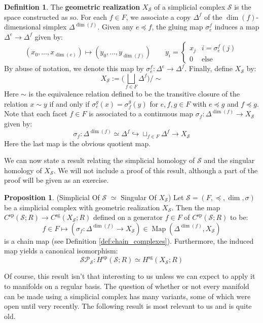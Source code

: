 \documentclass[12pt]{article}
\theoremstyle{definition}
\newtheorem{definition}[theorem]{Definition}
\newtheorem{proposition}[theorem]{Proposition}
\numberwithin{equation}{section}
\newcommand{\op}{\operatorname}
\begin{document}
\begin{definition}
The {\bf geometric realization} $X_{\mathcal{S}}$ of a simplicial complex $\mathcal{S}$ is the space constructed as so. For each $f \in F$, we associate a copy $\Delta^f$ of the $\op{dim}(f)$-dimensional simplex $\Delta^{\op{dim}(f)}$. Given any $e \preccurlyeq f$, the gluing map $\sigma_e^f$ induces a map $\Delta^e \to \Delta^f$ given by:
\[
(x_0,\dots,x_{\op{dim}(e)}) \mapsto (y_0,\dots,y_{\op{dim}(f)}) \qquad 
y_i = 
\left\{\begin{array}{cc}
x_j & i = \sigma^f_e(j)\\
0 & \text{else} 
\end{array}\right.
\]
By abuse of notation, we denote this map by $\sigma^f_e:\Delta^e \to \Delta^f$. Finally, define $X_{\mathcal{S}}$ by:
\[
X_{\mathcal{S}} := \big(\bigsqcup_{f \in F} \Delta^f\big)/\sim
\]
Here $\sim$ is the equivalence relation defined to be the transitive closure of the relation $x \sim y$ if and only if $\sigma_e^g(x) = \sigma^g_f(y)$ for $e,f,g \in F$ with $e \preccurlyeq g$ and $f \preccurlyeq g$. Note that each facet $f \in F$ is associated to a continuous map $\sigma_f:\Delta^{\op{dim}(f)} \to X_{\mathcal{S}}$ given by:
\[
\sigma_f:\Delta^{\op{dim}(f)} \simeq \Delta^f \hookrightarrow \sqcup_{f \in F} \Delta^f \to X_{\mathcal{S}}
\]
Here the last map is the obvious quotient map.
\end{definition}

We can now state a result relating the simplicial homology of $\mathcal{S}$ and the singular homology of $X_{\mathcal{S}}$. We will not include a proof of this result, although a part of the proof will be given as an exercise.

\begin{proposition} (Simplicial Of $\mathcal{S}$ $\simeq$ Singular Of $X_{\mathcal{S}}$) Let $\mathcal{S} = (F,\preccurlyeq,\op{dim},\sigma)$ be a simplicial complex with geometric realization $X_{\mathcal{S}}$. Then the map $C^{\op{sp}}(\mathcal{S};R) \to C^{\op{sg}}(X_{\mathcal{S}};R)$ defined on a generator $f \in F$ of $C^{\op{sp}}(\mathcal{S};R)$ to be:
\[
f \in F \mapsto (\sigma_f:\Delta^{\op{dim}(f)} \to X_{\mathcal{S}}) \in \op{Map}(\Delta^{\op{dim}(f)}, X_{\mathcal{S}})
\]
is a chain map (see Definition \ref{def:chain_complexes}). Furthermore, the induced map yields a canonical isomorphism:
\[
\mathcal{SP}_{\mathcal{S}}:H^{\op{sp}}(\mathcal{S};R) \simeq H^{\op{sg}}(X_{\mathcal{S}};R)
\]
\end{proposition}

Of course, this result isn't that interesting to us unless we can expect to apply it to manifolds on a regular basis. The question of whether or not every manifold can be made using a simplicial complex has many variants, some of which were open until very recently. The following result is most relevant to us and is quite old. 
\end{document}
